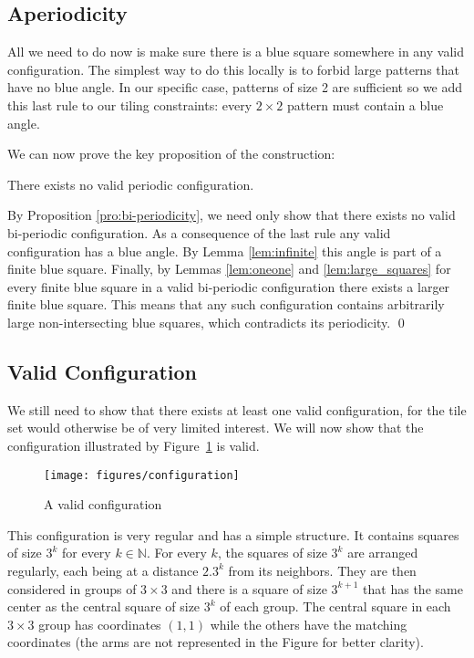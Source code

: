 \documentclass{jac}
\newcommand{\NN}{\mathbb{N}}
\begin{document}
\subsection{Aperiodicity} \label{sub:aperiodicity}
All we need to do now is make sure there is a blue square somewhere in any valid configuration. The simplest way to do this locally is to forbid large patterns that have no blue angle. In our specific case, patterns of size 2 are sufficient so we add this last rule to our tiling constraints: every $2\times 2$ pattern must contain a blue angle.

We can now prove the key proposition of the construction:
\begin{proposition}\label{pro:aperiodicity}
    There exists no valid periodic configuration.
\end{proposition}
\proof
By Proposition \ref{pro:bi-periodicity}, we need only show that there exists no valid bi-periodic configuration. As a consequence of the last rule any valid configuration has a blue angle. By Lemma \ref{lem:infinite} this angle is part of a finite blue square. Finally, by Lemmas \ref{lem:oneone} and \ref{lem:large_squares} for every finite blue square in a valid bi-periodic configuration there exists a larger finite blue square. This means that any such configuration contains arbitrarily large non-intersecting blue squares, which contradicts its periodicity.
\qed


\subsection{Valid Configuration} \label{sub:valid_configuration}
We still need to show that there exists at least one valid configuration, for the tile set would otherwise be of very limited interest. We will now show that the configuration illustrated by Figure~\ref{fig:configuration} is valid.

\begin{figure}[htbp]
	\centering
	\texttt{[image: figures/configuration]}
	\caption{A valid configuration}
	\label{fig:configuration}
\end{figure}

This configuration is very regular and has a simple structure. It contains squares of size $3^k$ for every $k\in\NN$. For every $k$, the squares of size $3^k$ are arranged regularly, each being at a distance $2.3^k$ from its neighbors. They are then considered in groups of $3\times 3$ and there is a square of size $3^{k+1}$ that has the same center as the central square of size $3^k$ of each group. The central square in each $3\times 3$ group has coordinates $(1,1)$ while the others have the matching coordinates (the arms are not represented in the Figure for better clarity).
\end{document}
